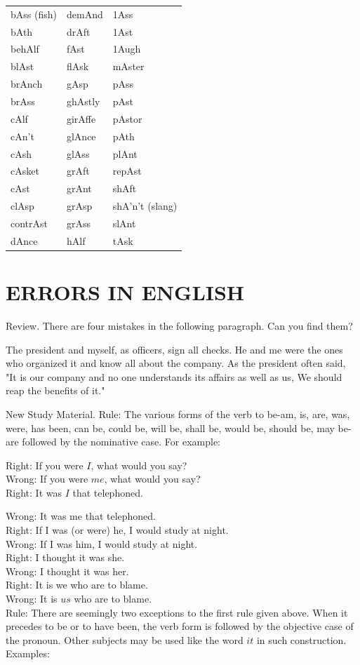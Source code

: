 \documentclass[10pt]{article}
\begin{document}
\begin{center}
\begin{tabular}{lll}
bAss (fish) & demAnd & 1Ass \\
bAth & drAft & 1Ast \\
behAlf & fAst & 1Augh \\
blAst & flAsk & mAster \\
brAnch & gAsp & pAss \\
brAss & ghAstly & pAst \\
cAlf & girAffe & pAstor \\
cAn't & glAnce & pAth \\
cAsh & glAss & plAnt \\
cAsket & grAft & repAst \\
cAst & grAnt & shAft \\
clAsp & grAsp & shA'n't (slang) \\
contrAst & grAss & slAnt \\
dAnce & hAlf & tAsk \\
\end{tabular}
\end{center}

\section*{ERRORS IN ENGLISH}
Review. There are four mistakes in the following paragraph. Can you find them?

The president and myself, as officers, sign all checks. He and me were the ones who organized it and know all about the company. As the president often said, "It is our company and no one understands its affairs as well as us, We should reap the benefits of it."

New Study Material. Rule: The various forms of the verb to be-am, is, are, was, were, has been, can be, could be, will be, shall be, would be, should be, may be-are followed by the nominative case. For example:

Right: If you were $I$, what would you say?\\
Wrong: If you were $m e$, what would you say?\\
Right: It was $I$ that telephoned.

Wrong: It was me that telephoned.\\
Right: If I was (or were) he, I would study at night.\\
Wrong: If I was him, I would study at night.\\
Right: I thought it was she.\\
Wrong: I thought it was her.\\
Right: It is we who are to blame.\\
Wrong: It is $u s$ who are to blame.\\
Rule: There are seemingly two exceptions to the first rule given above. When it precedes to be or to have been, the verb form is followed by the objective case of the pronoun. Other subjects may be used like the word $i t$ in such construction. Examples:
\end{document}

